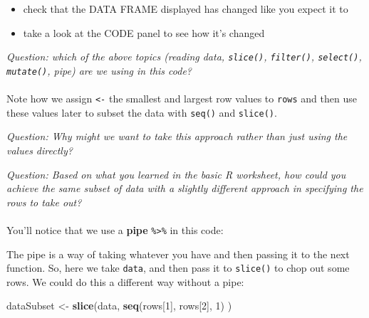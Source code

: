 \documentclass[
]{book}
\newenvironment{Shaded}{\begin{snugshade}}{\end{snugshade}}
\newcommand{\DecValTok}[1]{\textcolor[rgb]{0.00,0.00,0.81}{#1}}
\newcommand{\KeywordTok}[1]{\textcolor[rgb]{0.13,0.29,0.53}{\textbf{#1}}}
\newcommand{\NormalTok}[1]{#1}
\newcommand{\OperatorTok}[1]{\textcolor[rgb]{0.81,0.36,0.00}{\textbf{#1}}}
\newcommand{\StringTok}[1]{\textcolor[rgb]{0.31,0.60,0.02}{#1}}
\providecommand{\tightlist}{%
  \setlength{\itemsep}{0pt}\setlength{\parskip}{0pt}}
\begin{document}
\begin{itemize}
\tightlist
\item
  check that the DATA FRAME displayed has changed like you expect it to
\item
  take a look at the CODE panel to see how it's changed
\end{itemize}

\emph{Question: which of the above topics (reading data, \texttt{slice()}, \texttt{filter()},
\texttt{select()}, \texttt{mutate()}, pipe) are we using in this code?}\\
~\\

Note how we assign \texttt{\textless{}-} the smallest and largest row values to
\texttt{rows} and then use these values later to subset the data with \texttt{seq()} and
\texttt{slice()}.

\emph{Question: Why might we want to take this approach rather than just using
the values directly?}

\emph{Question: Based on what you learned in the basic R worksheet, how could you
achieve the same subset of data with a slightly different approach in
specifying the rows to take out?}\\
~\\

You'll notice that we use a \textbf{pipe} \texttt{\%\textgreater{}\%} in this code:

\begin{Shaded}
\end{Shaded}

The pipe is a way of taking whatever you have and then passing it to the next
function. So, here we take \texttt{data}, and then pass it to \texttt{slice()} to chop out
some rows. We could do this a different way without a pipe:

\begin{Shaded}
\begin{Highlighting}[]
\NormalTok{dataSubset <-}\StringTok{ }\KeywordTok{slice}\NormalTok{(data, }\KeywordTok{seq}\NormalTok{(rows[}\DecValTok{1}\NormalTok{], rows[}\DecValTok{2}\NormalTok{], }\DecValTok{1}\NormalTok{) )}
\end{Highlighting}
\end{Shaded}
\end{document}

